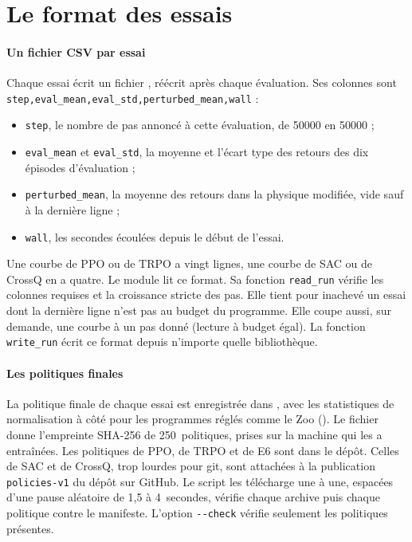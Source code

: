 \section{Le format des essais}\label{sec:format}

\paragraph{Un fichier CSV par essai}
Chaque essai écrit un fichier
\allowbreak{}\allowbreak{}\allowbreak{}, réécrit après chaque évaluation.
Ses colonnes sont
\texttt{step,}\allowbreak\texttt{eval\_mean,}\allowbreak\texttt{eval\_std,}\allowbreak\texttt{perturbed\_mean,}\allowbreak\texttt{wall} :
\begin{itemize}
  \item \texttt{step}, le nombre de pas annoncé à cette évaluation, de \num{50000} en \num{50000} ;
  \item \texttt{eval\_mean} et \texttt{eval\_std}, la moyenne et l'écart type des retours des dix épisodes
    d'évaluation ;
  \item \texttt{perturbed\_mean}, la moyenne des retours dans la physique modifiée, vide sauf à la dernière
    ligne ;
  \item \texttt{wall}, les secondes écoulées depuis le début de l'essai.
\end{itemize}
Une courbe de PPO ou de TRPO a vingt lignes, une courbe de SAC ou de CrossQ en a quatre. Le module
 lit ce format. Sa fonction \texttt{read\_run} vérifie les colonnes requises et
la croissance stricte des pas. Elle tient pour inachevé un essai dont la dernière ligne n'est pas au budget du
programme. Elle coupe aussi, sur demande, une courbe à un pas donné (lecture à budget égal). La fonction
\texttt{write\_run} écrit ce format depuis n'importe quelle bibliothèque.

\paragraph{Les politiques finales}
La politique finale de chaque essai est enregistrée dans
\allowbreak{}\allowbreak{}\allowbreak{}, avec les
statistiques de normalisation à côté pour les programmes réglés comme le Zoo (). Le fichier
 donne l'empreinte SHA-256 de 250~politiques, prises sur
la machine qui les a entraînées. Les politiques de PPO, de TRPO et de E6 sont dans le dépôt. Celles de SAC et
de CrossQ, trop lourdes pour git, sont attachées à la publication \texttt{policies-v1} du dépôt sur GitHub.
Le script  les télécharge une à une, espacées d'une pause aléatoire de 1,5 à
4~secondes, vérifie chaque archive puis chaque politique contre le manifeste. L'option
\texttt{-{}-check} vérifie seulement les politiques présentes.

